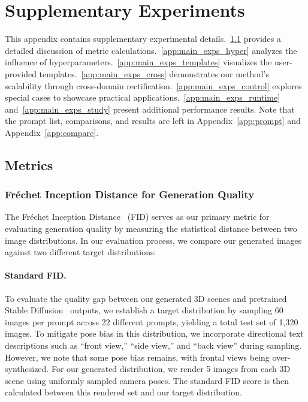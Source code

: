 \section{Supplementary Experiments}\label{app:main_exps}

This appendix contains supplementary experimental details.~\ref{app:main_exps_metrics} provides a detailed discussion of metric calculations.~\ref{app:main_exps_hyper} analyzes the influence of hyperparameters.~\ref{app:main_exps_templates} visualizes the user-provided templates.~\ref{app:main_exps_cross} demonstrates our method's scalability through cross-domain rectification.~\ref{app:main_exps_control} explores special cases to showcase practical applications.~\ref{app:main_exps_runtime} and~\ref{app:main_exps_study} present additional performance results. Note that the prompt list, comparisons, and results
are left in Appendix~\ref{app:prompt} and Appendix~\ref{app:compare}.




\subsection{Metrics}\label{app:main_exps_metrics}
\subsubsection{Fréchet Inception Distance for Generation Quality}
The Fréchet Inception Distance~\citep{heusel2017gans} (FID) serves as our primary metric for evaluating generation quality by measuring the statistical distance between two image distributions. In our evaluation process, we compare our generated images against two different target distributions:

\paragraph{Standard FID.}
To evaluate the quality gap between our generated 3D scenes and pretrained Stable Diffusion~\citep{rombach2022high} outputs, we establish a target distribution by sampling 60 images per prompt across 22 different prompts, yielding a total test set of 1,320 images. To mitigate pose bias in this distribution, we incorporate directional text descriptions such as ``front view,'' ``side view,'' and ``back view'' during sampling. However, we note that some pose bias remains, with frontal views being over-synthesized. For our generated distribution, we render 5 images from each 3D scene using uniformly sampled camera poses. The standard FID score is then calculated between this rendered set and our target distribution.

